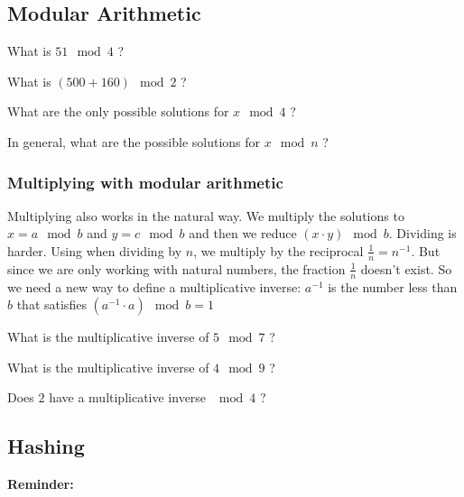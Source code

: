\documentclass[11pt,a4paper]{report}
\begin{document}
\subsection{Modular Arithmetic}

\begin{ex}
What is $51\mod 4$ ?
\end{ex}

\begin{ex}
What is $(500 + 160) \mod 2$ ?
\end{ex}


\begin{ex}
What are the only possible solutions for $x\mod 4$ ?
\end{ex}


\begin{ex}
In general, what are the possible solutions for $x\mod n$ ?
\end{ex}


\subsubsection{Multiplying with modular arithmetic}

Multiplying also works in the natural way. We multiply the solutions to $x = a\mod b$ and $y = c \mod b$ and then we reduce $(x\cdot y) \mod b$.
Dividing is harder. Using when dividing by $n$, we multiply by the reciprocal $\frac{1}{n}=n^{-1}$. But since we are only working with natural numbers, the fraction $\frac{1}{n}$ doesn’t exist. So we need a new way to
define a multiplicative inverse:
$a^{-1}$ is the number less than $b$ that satisfies $(a^{-1}\cdot a) \mod b = 1$


\begin{ex}
What is the multiplicative inverse of $5\mod 7$ ?
\end{ex}

\begin{ex}
What is the multiplicative inverse of $4\mod 9$ ?
\end{ex}

\begin{ex}
Does $2$ have a multiplicative inverse $\mod 4$ ?
\end{ex}


\newpage

\subsection{Hashing}
{\bf Reminder: }
\end{document}
